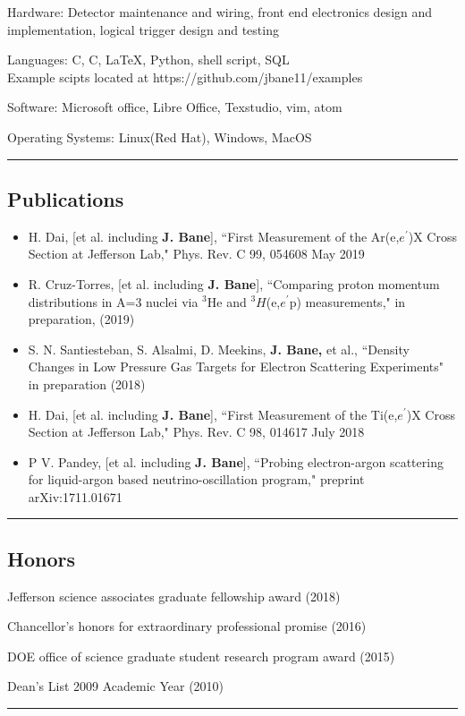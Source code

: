 \documentclass[12pt,letterpaper]{article}
\newenvironment{indentsection}[1]%
{\begin{list}{}%
	{\setlength{\leftmargin}{#1}}%
	\item[]%
}
{\end{list}}
\newcommand{\CPP}
{C\nolinebreak[4]\hspace{-.05em}\raisebox{.22ex}{\footnotesize\bf ++}}
\begin{document}
\begin{indentsection}{\parindent}
\begin{description*}
	\item[Hardware:]
	Detector maintenance and wiring, front end electronics design and implementation, logical trigger design and testing   
	\item[Languages:]
	C, \CPP, \LaTeX, Python, shell script, SQL \\
	Example scipts located at https://github.com/jbane11/examples
	\item[Software:]
	Microsoft office, Libre Office, Texstudio, vim, atom
	\item[Operating Systems:]
	Linux(Red Hat), Windows, MacOS
	
\end{description*}
\end{indentsection}
\hrule
\subsection*{Publications}
\begin{itemize} \itemsep -2pt %
	\item  H. Dai, [et al. including \textbf{J. Bane}], ``First Measurement of the Ar(e,$e^\prime$)X Cross Section at Jefferson Lab," Phys. Rev. C 99, 054608 May 2019
	\item R. Cruz-Torres, [et al. including \textbf{J. Bane}], ``Comparing proton momentum distributions in A=3 nuclei via $^3$He and $^3H$(e,$e^\prime$p) measurements," in preparation, (2019)
	\item S. N. Santiesteban, S. Alsalmi, D. Meekins, \textbf{J. Bane,} et al., ``Density Changes in Low Pressure Gas Targets for Electron Scattering Experiments" in preparation (2018) 
	
	\item  H. Dai, [et al. including \textbf{J. Bane}], ``First Measurement of the Ti(e,$e^\prime$)X Cross Section at Jefferson Lab," Phys. Rev. C 98, 014617 July 2018
	\item P V. Pandey, [et al. including \textbf{J. Bane}], ``Probing electron-argon scattering for liquid-argon based neutrino-oscillation program," preprint arXiv:1711.01671
	
\end{itemize}
\hrule
\subsection*{Honors}
	\begin{itemize*}
		\item Jefferson science associates graduate fellowship award (2018)  
		\item Chancellor’s honors for extraordinary professional promise (2016) 
		\item DOE office of science graduate student research program award (2015)
		\item Dean's List 2009 Academic Year (2010)
	\end{itemize*}
\hrule
\end{document}
